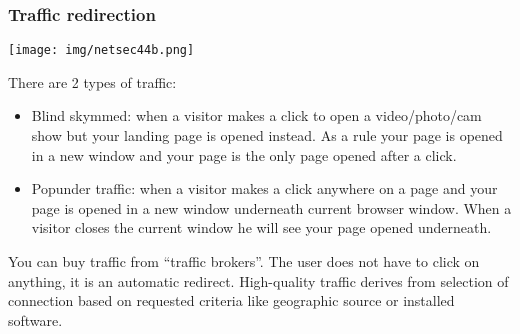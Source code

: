 \documentclass[a4paper, 10pt, titlepage]{article}
\begin{document}
\subsubsection*{Traffic redirection}
\begin{center}
	\texttt{[image: img/netsec44b.png]}
\end{center}
There are 2 types of traffic:
\begin{itemize}
	\item Blind skymmed: when a visitor makes a click to open a video/photo/cam show but your landing page is opened instead. As a rule your page is opened in a new window and your page is the only page opened after a click.
	\item Popunder traffic: when a visitor makes a click anywhere on a page and your page is opened in a new window underneath current browser window. When a visitor closes the current window he will see your page opened underneath.
\end{itemize}
You can buy traffic from “traffic brokers”. The user does not have to click on anything, it is an automatic redirect. High-quality traffic derives from selection of connection based on requested criteria like geographic source or installed software.
\end{document}
